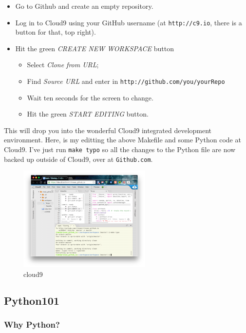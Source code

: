 \begin{itemize}
\itemsep1pt\parskip0pt
\item
  Go to Github and create an empty repository.
\item
  Log in to Cloud9 using your GitHub username (at \texttt{http://c9.io},
  there is a button for that, top right).
\item
  Hit the green \emph{CREATE NEW WORKSPACE} button

  \begin{itemize}
  \itemsep1pt\parskip0pt
  \item
    Select \emph{Clone from URL};
  \item
    Find \emph{Source URL} and enter in
    \texttt{http://github.com/you/yourRepo}
  \item
    Wait ten seconds for the screen to change.
  \item
    Hit the green \emph{START EDITING} button.
  \end{itemize}
\end{itemize}

This will drop you into the wonderful Cloud9 integrated development
environment. Here, is my editting the above Makefile and some Python
code at Cloud9. I've just run \texttt{make\ typo} so all the changes to
the Python file are now backed up outside of Cloud9, over at
\texttt{Github.com}.

\begin{figure}[htbp]
\centering
\includegraphics{img/c9400.png}
\caption{cloud9}
\end{figure}

\subsection{Python101}\label{python101}

\subsubsection{Why Python?}\label{why-python}

